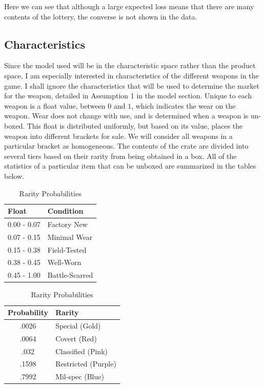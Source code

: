 \documentclass[12pt]{paper}
\begin{document}
Here we can see that although a large expected loss means that there
are many contents of the lottery, the converse is not shown in the
data. 

\subsection{Characteristics}

Since the model used will be in the characteristic space rather than
the product space, I am especially interested in characteristics of
the different weapons in the game. I shall ignore the characteristics
that will be used to determine the market for the weapon, detailed in
Assumption 1 in the model section. Unique to each weapon is a float
value, between $0$ and $1$, which indicates the wear on the
weapon. Wear does not change with use, and is determined when a weapon
is un-boxed. This float is distributed uniformly, but based on its
value, places the weapon into different brackets for sale. We will
consider all weapons in a particular bracket as homogeneous. The
contents of the crate are divided into several tiers based on their
rarity from being obtained in a box. All of the statistics of a
particular item that can be unboxed are summarized in the tables
below.


\begin{table}[!htb]
    \begin{minipage}{.5\linewidth}
      \caption{Condition Probabilities}
      \centering
        \begin{tabular}{|l|l|}\hline
          Float & Condition\\\hline
          0.00 - 0.07 & Factory New\\
          0.07 - 0.15 & Minimal Wear\\
          0.15 - 0.38 & Field-Tested\\
          0.38 - 0.45 & Well-Worn\\
          0.45 - 1.00 & Battle-Scarred\\\hline
\end{tabular}
    \end{minipage}%
    \begin{minipage}{.5\linewidth}
      \centering
        \caption{Rarity Probabilities}
        \begin{tabular}{|c|l|}\hline
          Probability & Rarity\\\hline
          .0026 & Special (Gold)\\
          .0064 & Covert (Red)\\
          .032 & Classified (Pink)\\
          .1598 & Restricted (Purple)\\
          .7992 & Mil-spec (Blue)\\\hline
\end{tabular}
    \end{minipage} 
\end{table}
\end{document}
